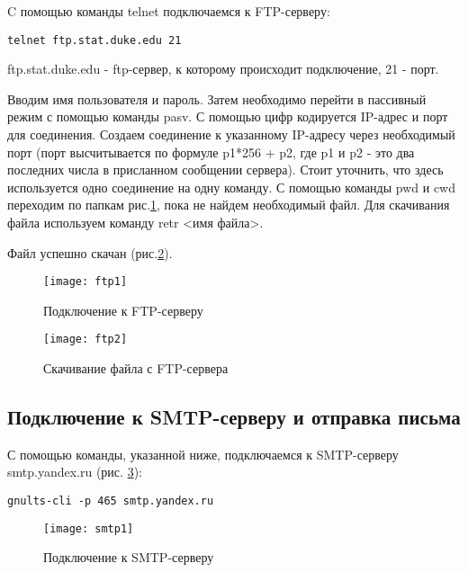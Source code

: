 C помощью команды telnet подключаемся к FTP-серверу:

\begin{lstlisting}
telnet ftp.stat.duke.edu 21
\end{lstlisting}

ftp.stat.duke.edu - ftp-сервер, к которому происходит подключение, 21 - порт.

Вводим имя пользователя и пароль. Затем необходимо перейти в пассивный режим с помощью команды pasv. С помощью цифр кодируется IP-адрес и порт для соединения. Создаем соединение к указанному IP-адресу через необходимый порт (порт высчитывается по формуле p1*256 + p2, где p1 и p2 - это два последних числа в присланном сообщении сервера). Стоит уточнить, что здесь используется одно соединение на одну команду.
С помощью команды pwd и cwd переходим по папкам рис.\ref{pic:ftp1}, пока не найдем необходимый файл. Для скачивания файла используем команду retr <имя файла>.

Файл успешно скачан (рис.\ref{pic:ftp2}).

\begin{figure}[H]
	\begin{center}
		\texttt{[image: ftp1]}
		\caption{Подключение к FTP-серверу} 
		\label{pic:ftp1} %
	\end{center}
\end{figure}

\begin{figure}[H]
	\begin{center}
		\texttt{[image: ftp2]}
		\caption{Скачивание файла с FTP-сервера} 
		\label{pic:ftp2} %
	\end{center}
\end{figure}

\subsection{Подключение к SMTP-серверу и отправка письма}

С помощью команды, указанной ниже, подключаемся к SMTP-серверу smtp.yandex.ru (рис. \ref{pic:smtp1}):

\begin{lstlisting}
gnults-cli -p 465 smtp.yandex.ru
\end{lstlisting}

\begin{figure}[H]
	\begin{center}
		\texttt{[image: smtp1]}
		\caption{Подключение к SMTP-серверу} 
		\label{pic:smtp1} %
	\end{center}
\end{figure}

